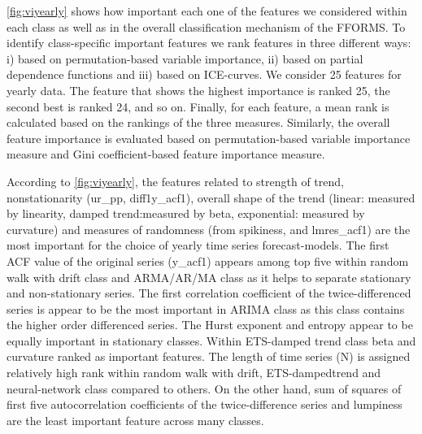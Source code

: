 \documentclass[11pt,a4paper,]{article}
\begin{document}
\autoref{fig:viyearly} shows how important each one of the features we
considered within each class as well as in the overall classification
mechanism of the FFORMS. To identify class-specific important features
we rank features in three different ways: i) based on permutation-based
variable importance, ii) based on partial dependence functions and iii)
based on ICE-curves. We consider 25 features for yearly data. The
feature that shows the highest importance is ranked 25, the second best
is ranked 24, and so on. Finally, for each feature, a mean rank is
calculated based on the rankings of the three measures. Similarly, the
overall feature importance is evaluated based on permutation-based
variable importance measure and Gini coefficient-based feature
importance measure.

According to \autoref{fig:viyearly}, the features related to strength of
trend, nonstationarity (ur\_pp, diff1y\_acf1), overall shape of the
trend (linear: measured by linearity, damped trend:measured by beta,
exponential: measured by curvature) and measures of randomness (from
spikiness, and lmres\_acf1) are the most important for the choice of
yearly time series forecast-models. The first ACF value of the original
series (y\_acf1) appears among top five within random walk with drift
class and ARMA/AR/MA class as it helps to separate stationary and
non-stationary series. The first correlation coefficient of the
twice-differenced series is appear to be the most important in ARIMA
class as this class contains the higher order differenced series. The
Hurst exponent and entropy appear to be equally important in stationary
classes. Within ETS-damped trend class beta and curvature ranked as
important features. The length of time series (N) is assigned relatively
high rank within random walk with drift, ETS-dampedtrend and
neural-network class compared to others. On the other hand, sum of
squares of first five autocorrelation coefficients of the
twice-difference series and lumpiness are the least important feature
across many classes.
\end{document}
